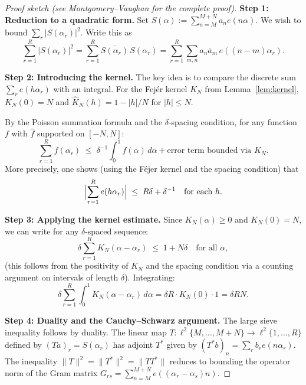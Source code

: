 \documentclass[12pt,a4paper]{amsart}
\theoremstyle{definition}
\newcommand{\eexp}[1]{e\!\left(#1\right)}
\begin{document}
\begin{proof}[Proof sketch (see Montgomery--Vaughan \cite{MV1973} for the complete proof)]
  \textbf{Step 1: Reduction to a quadratic form.}
  Set $S(\alpha) := \sum_{n=M}^{M+N}a_n\eexp{n\alpha}$.  We wish to bound
  $\sum_r |S(\alpha_r)|^2$.  Write this as
  \[
    \sum_{r=1}^{R}|S(\alpha_r)|^{2}
    = \sum_{r=1}^{R}\overline{S(\alpha_r)}\,S(\alpha_r)
    = \sum_{r=1}^{R}\sum_{m,n}a_n\bar{a}_m\,\eexp{(n-m)\alpha_r}.
  \]

  \textbf{Step 2: Introducing the kernel.}
  The key idea is to compare the discrete sum $\sum_r \eexp{h\alpha_r}$
  with an integral.  For the Fejér kernel $K_N$ from Lemma~\ref{lem:kernel},
  $K_N(0) = N$ and $\hat{K}_N(h) = 1 - |h|/N$ for $|h| \leq N$.

  By the Poisson summation formula and the $\delta$-spacing condition, for
  any function $f$ with $\hat{f}$ supported on $[-N, N]$:
  \[
    \sum_{r=1}^{R} f(\alpha_r)
    \;\leq\;
    \delta^{-1}\int_0^1 f(\alpha)\,d\alpha + \text{error term bounded via } K_N.
  \]
  More precisely, one shows (using the Féjer kernel and the spacing condition) that
  \[
    \Bigl|\sum_{r=1}^{R}\eexp{h\alpha_r}\Bigr|
    \;\leq\;
    R\delta + \delta^{-1} \quad \text{for each } h.
  \]

  \textbf{Step 3: Applying the kernel estimate.}
  Since $K_N(\alpha) \geq 0$ and $K_N(0) = N$, we can write for any
  $\delta$-spaced sequence:
  \[
    \delta\sum_{r=1}^{R}K_N(\alpha - \alpha_r)
    \;\leq\; 1 + N\delta
    \quad\text{for all }\alpha,
  \]
  (this follows from the positivity of $K_N$ and the spacing condition via
  a counting argument on intervals of length $\delta$).  Integrating:
  \[
    \delta\sum_{r=1}^{R}\int_0^1 K_N(\alpha-\alpha_r)\,d\alpha
    = \delta R \cdot K_N(0) \cdot 1 = \delta R N.
  \]

  \textbf{Step 4: Duality and the Cauchy--Schwarz argument.}
  The large sieve inequality follows by duality.  The linear map
  $T\colon \ell^2\{M,\ldots,M+N\} \to \ell^2\{1,\ldots,R\}$ defined by
  $(Ta)_r = S(\alpha_r)$ has adjoint $T^*$ given by
  $(T^* b)_n = \sum_r b_r \eexp{n\alpha_r}$.  The inequality
  $\|T\|^2 = \|T^*\|^2 = \|TT^*\|$ reduces to bounding the operator norm
  of the Gram matrix $G_{rs} = \sum_{n=M}^{M+N} \eexp{(\alpha_r - \alpha_s)n}$.


\end{proof}
\end{document}
